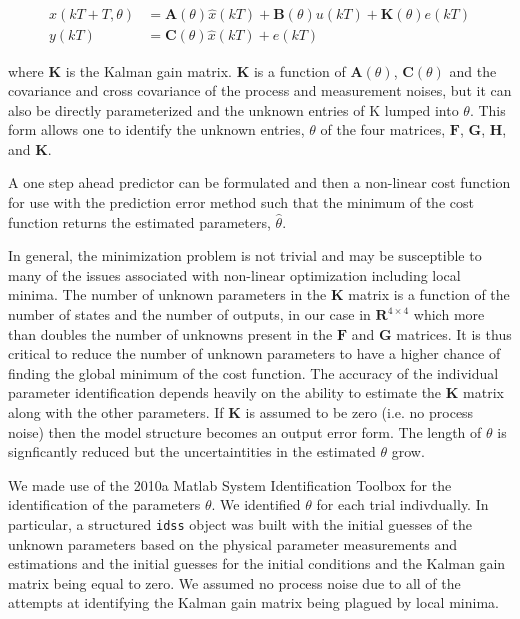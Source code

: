 \documentclass[a4paper]{article}
\begin{document}
\begin{align}
  \hat{x}(kT + T, \theta) & =
    \mathbf{A}(\theta)\hat{x}(kT) + \mathbf{B}(\theta)u(kT) + \mathbf{K}(\theta)e(kT)\\
  y(kT) & = \mathbf{C}(\theta)\hat{x}(kT) + e(kT)
\end{align}

where $\mathbf{K}$ is the Kalman gain matrix. $\mathbf{K}$ is a function of
$\mathbf{A}(\theta)$, $\mathbf{C}(\theta)$ and the covariance and cross
covariance of the process and measurement noises, but it can also be directly
parameterized and the unknown entries of K lumped into $\theta$. This form
allows one to identify the unknown entries, $\theta$ of the four matrices,
$\mathbf{F}$, $\mathbf{G}$, $\mathbf{H}$, and $\mathbf{K}$.

A one step ahead predictor can be formulated and then a non-linear cost
function for use with the prediction error method \cite{Ljung1999} such that
the minimum of the cost function returns the estimated parameters,
$\hat{\theta}$.

In general, the minimization problem is not trivial and may be susceptible to
many of the issues associated with non-linear optimization including local
minima. The number of unknown parameters in the $\mathbf{K}$ matrix is a
function of the number of states and the number of outputs, in our case in
$\mathbf{R}^{4\times4}$ which more than doubles the number of unknowns present
in the $\mathbf{F}$ and $\mathbf{G}$ matrices. It is thus critical to reduce
the number of unknown parameters to have a higher chance of finding the global
minimum of the cost function. The accuracy of the individual parameter
identification depends heavily on the ability to estimate the $\mathbf{K}$
matrix along with the other parameters. If $\mathbf{K}$ is assumed to be zero
(i.e. no process noise) then the model structure becomes an output error form.
The length of $\theta$ is signficantly reduced but the uncertaintities in the
estimated $\theta$ grow.

We made use of the 2010a Matlab System Identification Toolbox for the
identification of the parameters $\theta$. We identified $\theta$ for each
trial indivdually. In particular, a structured \verb|idss| object was built
with the initial guesses of the unknown parameters based on the physical
parameter measurements and estimations and the initial guesses for the initial
conditions and the Kalman gain matrix being equal to zero. We assumed no
process noise due to all of the attempts at identifying the Kalman gain matrix
being plagued by local minima.
\end{document}
